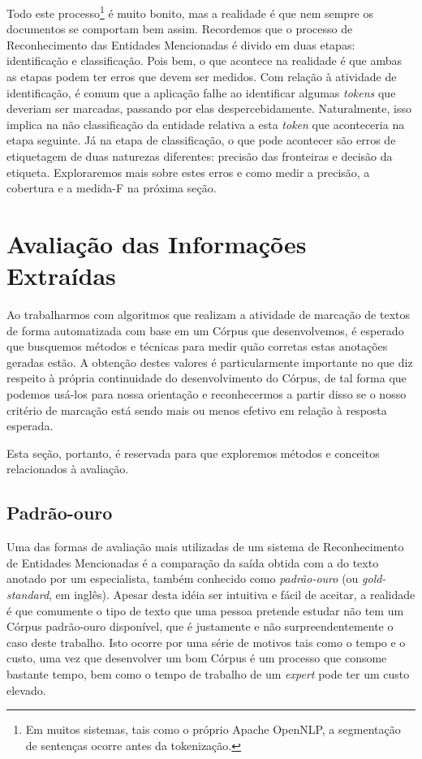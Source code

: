 \documentclass[11pt]{report}
\begin{document}
Todo este processo\footnote[9]{Em muitos sistemas, tais como o próprio Apache OpenNLP, a segmentação de sentenças ocorre antes da tokenização.} é muito bonito, mas a realidade é que nem sempre 
os documentos se comportam bem assim. Recordemos que o processo de Reconhecimento das Entidades Mencionadas
é divido em duas etapas: identificação e classificação. Pois bem, o que acontece na realidade é que ambas as etapas podem ter erros que devem ser medidos. Com relação
à atividade de identificação, é comum que a aplicação falhe ao identificar algumas \textit{tokens} que deveriam ser marcadas, passando por elas despercebidamente. Naturalmente, isso
implica na não classificação da entidade relativa a esta \textit{token} que aconteceria na etapa seguinte. Já na etapa de classificação, o que pode acontecer são erros de etiquetagem
de duas naturezas diferentes: precisão das fronteiras e decisão da etiqueta. Exploraremos mais sobre estes erros e como medir a precisão, a cobertura e a medida-F na próxima seção.

\section{Avaliação das Informações Extraídas}

\indent\indent Ao trabalharmos com algoritmos que realizam a atividade de marcação de textos de forma automatizada com base em um Córpus que desenvolvemos, é
esperado que busquemos métodos e técnicas para medir quão corretas estas anotações geradas estão. A obtenção destes valores é particularmente
importante no que diz respeito à própria continuidade do desenvolvimento do Córpus, de tal forma que podemos usá-los para nossa orientação e
reconhecermos a partir disso se o nosso critério de marcação está sendo mais ou menos efetivo em relação à resposta esperada.

Esta seção, portanto,
é reservada para que exploremos métodos e conceitos relacionados à avaliação.

\subsection{Padrão-ouro}

\indent\indent Uma das formas de avaliação mais utilizadas de um sistema de Reconhecimento de Entidades Mencionadas é a comparação da saída obtida com a do texto anotado por
um especialista, também conhecido como \textit{padrão-ouro} (ou \textit{gold-standard}, em inglês). Apesar desta idéia ser intuitiva e fácil de aceitar, a realidade é que
comumente o tipo de texto que uma pessoa pretende estudar não tem um Córpus padrão-ouro disponível, que é justamente e não surpreendentemente o caso deste trabalho. Isto ocorre
por uma série de motivos tais como o tempo e o custo, uma vez que desenvolver um bom Córpus é um processo que consome bastante tempo, bem como o tempo de trabalho de um \textit{expert}
pode ter um custo elevado.
\end{document}
